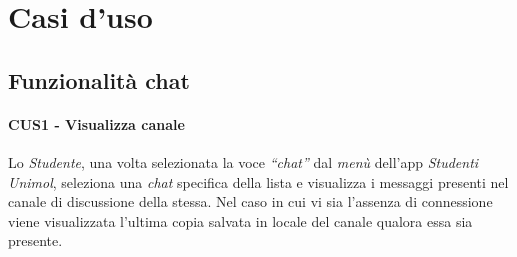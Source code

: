 \section{Casi d'uso}
\subsection{Funzionalità chat}
\paragraph{CUS1 - Visualizza canale \\}

Lo \emph{Studente}, una volta selezionata la voce \emph{“chat”} dal \emph{menù} dell’app \emph{Studenti Unimol},  seleziona una \emph{chat} specifica della lista e visualizza i messaggi presenti nel canale di discussione della stessa. Nel caso in cui vi sia l’assenza di connessione viene visualizzata l’ultima copia salvata in locale del canale qualora essa sia presente.
